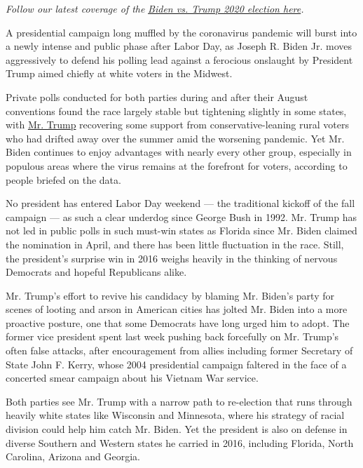\emph{Follow our latest coverage of the}
\href{https://www.nytimes3xbfgragh.onion/live/2020/09/11/us/trump-vs-biden}{\emph{Biden
vs. Trump 2020 election here}}\emph{.}

A presidential campaign long muffled by the coronavirus pandemic will
burst into a newly intense and public phase after Labor Day, as Joseph
R. Biden Jr. moves aggressively to defend his polling lead against a
ferocious onslaught by President Trump aimed chiefly at white voters in
the Midwest.

Private polls conducted for both parties during and after their August
conventions found the race largely stable but tightening slightly in
some states, with
\href{https://www.nytimes3xbfgragh.onion/2020/09/09/us/politics/biden-trump-michigan-jobs-taxes.html}{Mr.
Trump} recovering some support from conservative-leaning rural voters
who had drifted away over the summer amid the worsening pandemic. Yet
Mr. Biden continues to enjoy advantages with nearly every other group,
especially in populous areas where the virus remains at the forefront
for voters, according to people briefed on the data.

No president has entered Labor Day weekend --- the traditional kickoff
of the fall campaign --- as such a clear underdog since George Bush in
1992. Mr. Trump has not led in public polls in such must-win states as
Florida since Mr. Biden claimed the nomination in April, and there has
been little fluctuation in the race. Still, the president's surprise win
in 2016 weighs heavily in the thinking of nervous Democrats and hopeful
Republicans alike.

Mr. Trump's effort to revive his candidacy by blaming Mr. Biden's party
for scenes of looting and arson in American cities has jolted Mr. Biden
into a more proactive posture, one that some Democrats have long urged
him to adopt. The former vice president spent last week pushing back
forcefully on Mr. Trump's often false attacks, after encouragement from
allies including former Secretary of State John F. Kerry, whose 2004
presidential campaign faltered in the face of a concerted smear campaign
about his Vietnam War service.

Both parties see Mr. Trump with a narrow path to re-election that runs
through heavily white states like Wisconsin and Minnesota, where his
strategy of racial division could help him catch Mr. Biden. Yet the
president is also on defense in diverse Southern and Western states he
carried in 2016, including Florida, North Carolina, Arizona and Georgia.

